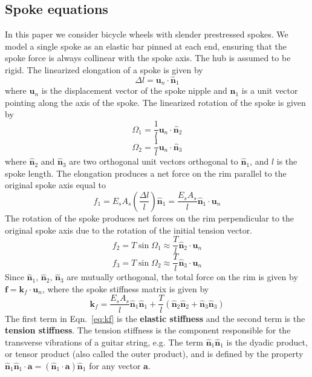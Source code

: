 \documentclass{bmd2016p}
\newcommand{\n}{\ensuremath{\hat{\bm{n}}_1}}
\newcommand{\nn}{\ensuremath{\hat{\bm{n}}_2}}
\newcommand{\nnn}{\ensuremath{\hat{\bm{n}}_3}}
\begin{document}
\subsection{Spoke equations}

In this paper we consider bicycle wheels with slender prestressed spokes. We model a single spoke as an elastic bar pinned at each end, ensuring that the spoke force is always collinear with the spoke axis. The hub is assumed to be rigid. The linearized elongation of a spoke is given by
	\begin{equation}\label{eq:selong}
	\Delta l = \bm{u}_n\cdot \n
	\end{equation}
where $\bm{u}_n$ is the displacement vector of the spoke nipple and \n{} is a unit vector pointing along the axis of the spoke. The linearized rotation of the spoke is given by
	\begin{equation}\label{eq:srot1}
	\Omega_1 = \frac{1}{l} \bm{u}_n\cdot \nn
	\end{equation}
	\begin{equation}\label{eq:srot2}
	\Omega_2 = \frac{1}{l} \bm{u}_n\cdot \nnn
	\end{equation}
where \nn{} and \nnn{} are two orthogonal unit vectors orthogonal to \n{}, and $l$ is the spoke length. The elongation produces a net force on the rim parallel to the original spoke axis equal to
	\begin{equation}\label{eq:sF1}
	f_1 = E_sA_s\left(\frac{\Delta l}{l}\right)\n = \frac{E_sA_s}{l} \n \cdot \bm{u}_n 
	\end{equation}
The rotation of the spoke produces net forces on the rim perpendicular to the original spoke axis due to the rotation of the initial tension vector.
	\begin{equation}\label{eq:sF2}
	f_2 = T \sin{\Omega_1} \approx \frac{T}{l} \nn \cdot \bm{u}_n
	\end{equation}
	\begin{equation}\label{eq:sF3}
	f_3 = T \sin{\Omega_2} \approx \frac{T}{l} \nnn \cdot \bm{u}_n
	\end{equation}
Since \n{}, \nn{}, \nnn{} are mutually orthogonal, the total force on the rim is given by $\bm{f} = \bm{k}_f \cdot \bm{u}_n$, where the spoke stiffness matrix is given by
	\begin{equation}\label{eq:kf}
	\bm{k}_f = \frac{E_sA_s}{l}\n\n + \frac{T}{l}(\nn\nn + \nnn\nnn)
	\end{equation}
The first term in Eqn.~\ref{eq:kf} is the {\bf elastic stiffness} and the second term is the {\bf tension stiffness}. The tension stiffness is the component responsible for the transverse vibrations of a guitar string, e.g. The term $\n\n$ is the dyadic product, or tensor product (also called the outer product), and is defined by the property $\n\n\cdot \bm{a} = (\n\cdot \bm{a})\n$ for any vector $\bm{a}$.
\end{document}
